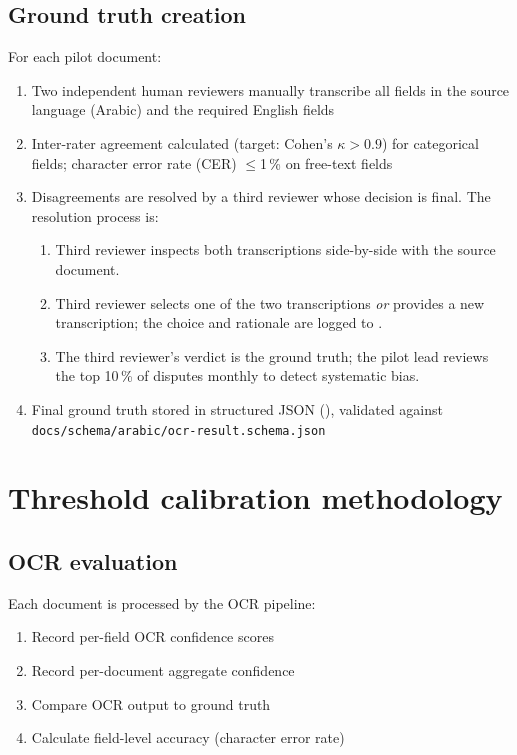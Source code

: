 \documentclass[11pt,a4paper,twoside]{report}
\begin{document}
\subsection{Ground truth creation}

For each pilot document:
\begin{enumerate}
  \item Two independent human reviewers manually transcribe all fields
        in the source language (Arabic) and the required English fields
  \item Inter-rater agreement calculated (target: Cohen's $\kappa > 0.9$)
        for categorical fields; character error rate (CER) $\le$1\,\%
        on free-text fields
  \item Disagreements are resolved by a third reviewer whose decision is
        final. The resolution process is:
        \begin{enumerate}
          \item Third reviewer inspects both transcriptions side-by-side
                with the source document.
          \item Third reviewer selects one of the two transcriptions
                \emph{or} provides a new transcription; the choice and
                rationale are logged to
                .
          \item The third reviewer's verdict is the ground truth; the
                pilot lead reviews the top 10\,\% of disputes monthly
                to detect systematic bias.
        \end{enumerate}
  \item Final ground truth stored in structured JSON
        (), validated
        against \texttt{docs/schema/arabic/ocr-result.schema.json}
\end{enumerate}

\section{Threshold calibration methodology}

\subsection{OCR evaluation}

Each document is processed by the OCR pipeline:
\begin{enumerate}
  \item Record per-field OCR confidence scores
  \item Record per-document aggregate confidence
  \item Compare OCR output to ground truth
  \item Calculate field-level accuracy (character error rate)
\end{enumerate}
\end{document}

